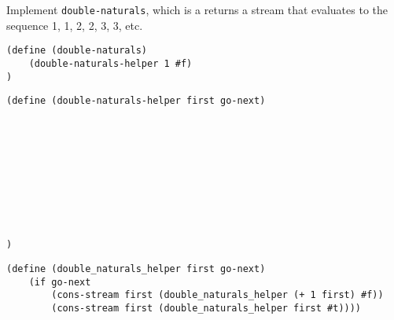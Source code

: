 \begin{blocksection}
\question Implement \lstinline$double-naturals$, which is a returns a stream that evaluates to the sequence 1, 1, 2, 2, 3, 3, etc.

\begin{lstlisting}
(define (double-naturals)
    (double-naturals-helper 1 #f)
)
\end{lstlisting}

\ifprintanswers\else
\begin{lstlisting}
(define (double-naturals-helper first go-next)










)
\end{lstlisting}
\fi

\begin{solution}
\begin{lstlisting}
(define (double_naturals_helper first go-next)
    (if go-next
        (cons-stream first (double_naturals_helper (+ 1 first) #f))
        (cons-stream first (double_naturals_helper first #t))))
\end{lstlisting}
\end{solution}
\end{blocksection}
